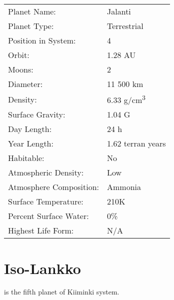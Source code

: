 \documentclass{tufte-book}
\begin{document}
\bigskip
\begin{minipage}{\textwidth}
\begin{center}
\begin{tabular}{ll}
\toprule
Planet Name: & Jalanti \\
Planet Type: & Terrestrial \\
Position in System: & 4 \\
Orbit: & 1.28 AU \\
Moons: & 2 \\
Diameter: & 11 500 km \\
Density: & 6.33 g/cm\textsuperscript{3} \\
Surface Gravity: & 1.04 G \\
Day Length: & 24 h \\
Year Length: & 1.62 terran years \\
Habitable: & No \\
\quad Atmospheric Density: & Low \\
\quad Atmosphere Composition: & Ammonia \\
\quad Surface Temperature: & 210K \\
\quad Percent Surface Water: & 0\% \\
\quad Highest Life Form: & N/A \\

\bottomrule
\end{tabular}
\end{center}
\end{minipage}

\section{Iso-Lankko}

 is the fifth planet of Kiiminki system.
\end{document}
